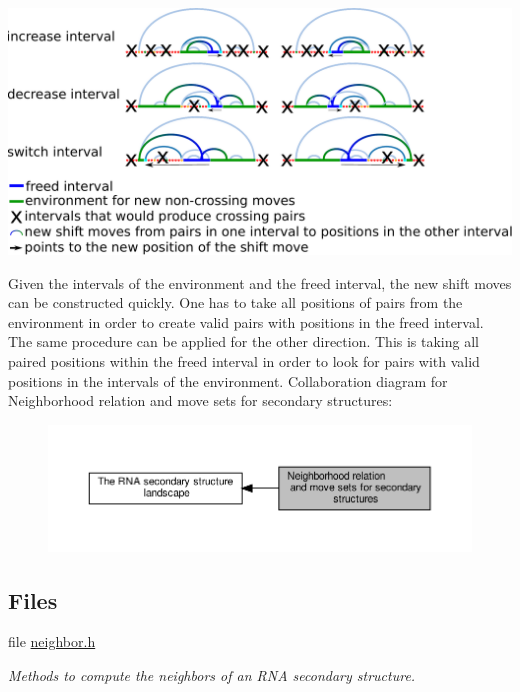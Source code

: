  
\begin{DoxyImageNoCaption}
  \mbox{\includegraphics[width=\textwidth,height=\textheight/2,keepaspectratio=true]{shift_move_intervals}}
\end{DoxyImageNoCaption}


Given the intervals of the environment and the freed interval, the new shift moves can be constructed quickly. One has to take all positions of pairs from the environment in order to create valid pairs with positions in the freed interval. The same procedure can be applied for the other direction. This is taking all paired positions within the freed interval in order to look for pairs with valid positions in the intervals of the environment. Collaboration diagram for Neighborhood relation and move sets for secondary structures\+:
\nopagebreak
\begin{figure}[H]
\begin{center}
\leavevmode
\includegraphics[width=350pt]{group__neighbors}
\end{center}
\end{figure}
\subsection*{Files}
\begin{DoxyCompactItemize}
\item 
file \hyperlink{neighbor_8h}{neighbor.\+h}
\begin{DoxyCompactList}\small\item\em Methods to compute the neighbors of an R\+NA secondary structure. \end{DoxyCompactList}\end{DoxyCompactItemize}
